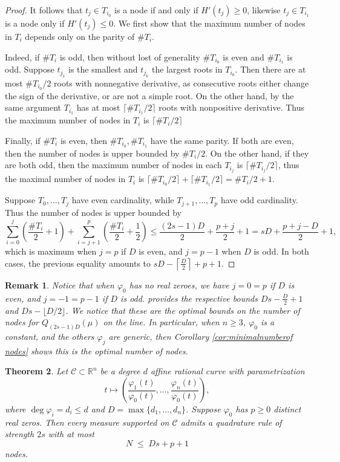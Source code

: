 \documentclass[11pt,a4paper]{amsart}
\numberwithin{equation}{section}
\newtheorem{thm}{Theorem}
\newtheorem{remark}[thm]{Remark}
\theoremstyle{definition}
\numberwithin{thm}{section}
\theoremstyle{break}
\numberwithin{subcase}{case}
\begin{document}
\begin{proof}
    It follows that $t_j\in T_{i_0}$ is a node if and only if $H'(t_j)\geq0$, likewise $t_j\in T_{i_1}$ is a node only if $H'(t_j)\leq 0$. We first show that the maximum number of nodes in $T_i$ depends only on the parity of $\#T_i$.

    Indeed, if $\#T_i$ is odd, then without lost of generality $\#T_{i_0}$ is even and $\#T_{i_1}$ is odd. Suppose $t_{j_1}$ is the smallest and $t_{j_k}$ the largest roots in $T_{i_0}$. Then there are at most $\#T_{i_0}/2$ roots with nonnegative derivative, as consecutive roots either change the sign of the derivative, or are not a simple root. On the other hand, by the same argument $T_{i_1}$ has at most $\lceil\#T_{i_1}/2 \rceil$ roots with nonpositive derivative. Thus the maximum number of nodes in $T_i$ is $\lceil\#T_i/2 \rceil$

    Finally, if $\#T_i$ is even, then $\#T_{i_0},\#T_{i_1}$ have the same parity. If both are even, then the number of nodes is upper bounded by $\#T_i/2$. On the other hand, if they are both odd, then the maximum number of nodes in each $T_{i_j}$ is $\lceil \#T_{i_j}/2\rceil$, thus the maximal number of nodes in $T_i$ is $\lceil \#T_{i_0}/2\rceil+\lceil \#T_{i_1}/2\rceil= \#T_{i}/2+1$.

     Suppose $T_0,\dots,T_j$ have even cardinality, while $T_{j+1},\dots,T_{p}$ have odd cardinality. Thus the number of nodes is upper bounded by $$
    \sum_{i=0}^j \left(\frac{\#T_i}{2}+1\right)+\sum_{i=j+1}^{p}\left(\frac{\#T_i}{2}+\frac{1}{2}\right)\leq\frac{(2s-1)D}{2} +\frac{p+j}{2}+1=sD+\frac{p+j-D}{2}+1,
    $$
    which is maximum when $j=p$ if $D$ is even, and $j=p-1$ when $D$ is odd. In both cases, the previous equality amounts to $
    sD-\left\lceil \frac{D}{2}\right\rceil +p+1.
    $

    
\end{proof}
\begin{remark}\label{rmk:optimaln>3}
    Notice that when $\varphi_0$ has no real zeroes, we have $j=0=p$ if $D$ is even, and $j=-1=p-1$ if $D$ is odd.  provides the respective bounds $Ds-\frac{D}{2}+1$ and $Ds-\lfloor D/2\rfloor$. We notice that these are the optimal bounds on the number of nodes for $Q_{(2s-1)D}(\mu)$ on the line. In particular, when  $n\geq 3$, $\varphi_0$ is a constant, and the others $\varphi_j$ are generic, then Corollary \ref{cor:minimalnumberof nodes} shows this is the optimal number of nodes.
\end{remark}


\begin{thm}\label{thm:quadraturerationaleven}
Let $\mathcal C \subset \mathbb R^n$ be a degree $d$ affine rational curve with parametrization
\[
t \mapsto \left(\frac{\varphi_1(t)}{\varphi_0(t)}, \dots, \frac{\varphi_n(t)}{\varphi_0(t)}\right),
\]
where $\deg \varphi_i = d_i \le d$ and $D = \max\{d_1,\dots,d_n\}$.
Suppose $\varphi_0$ has $p \ge 0$ distinct real zeros.  
Then every measure supported on $\mathcal C$ admits a quadrature rule of strength $2s$ with at most
\[
N \;\le\; D s + p + 1
\]
nodes.
\end{thm}
\end{document}
